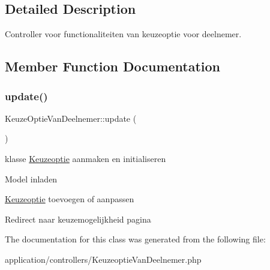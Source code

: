 \subsection{Detailed Description}
Controller voor functionaliteiten van keuzeoptie voor deelnemer. 

\subsection{Member Function Documentation}
\mbox{\label{class_keuze_optie_van_deelnemer_a04438616b87ca22ac662c94abc043c39}} 
\subsubsection{\texorpdfstring{update()}{update()}}
{\footnotesize\ttfamily Keuze\+Optie\+Van\+Deelnemer\+::update (\begin{DoxyParamCaption}{ }\end{DoxyParamCaption})}

klasse \mbox{\hyperlink{class_keuzeoptie}{Keuzeoptie}} aanmaken en initialiseren

Model inladen

\mbox{\hyperlink{class_keuzeoptie}{Keuzeoptie}} toevoegen of aanpassen

Redirect naar keuzemogelijkheid pagina 

The documentation for this class was generated from the following file\+:\begin{DoxyCompactItemize}
\item 
application/controllers/Keuzeoptie\+Van\+Deelnemer.\+php\end{DoxyCompactItemize}
